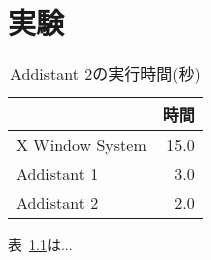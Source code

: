 \chapter{実験}

\begin{table}[tb]
 \begin{center}
  \caption{Addistant 2の実行時間(秒)}
  \label{tab:time}
  \begin{tabular}{lr}
   \hline
                   & 時間 \\
   \hline
   X Window System & 15.0 \\
   Addistant 1     &  3.0 \\
   Addistant 2     &  2.0 \\
   \hline
  \end{tabular}
 \end{center}
\end{table}

表~\ref{tab:time}は...

